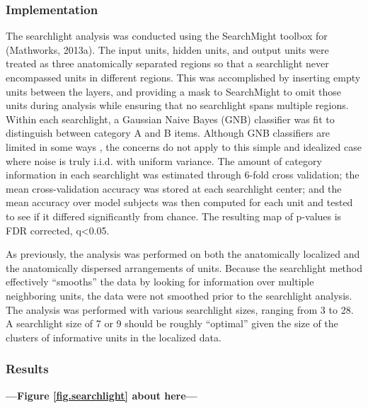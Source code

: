 \subsubsection{Implementation}
The searchlight analysis was conducted using the SearchMight toolbox \cite{pereira_information_2011} for \matlab (Mathworks, 2013a). The input units, hidden units, and output units were treated as three anatomically separated regions so that a searchlight never encompassed units in different regions. This was accomplished by inserting empty units between the layers, and providing a mask to SearchMight to omit those units during analysis while ensuring that no searchlight spans multiple regions. Within each searchlight, a Gaussian Naive Bayes (GNB) classifier was fit to distinguish between category A and B items. Although GNB classifiers are limited in some ways \cite{pereira_information_2011}, the concerns do not apply to this simple and idealized case where noise is truly i.i.d. with uniform variance. The amount of category information in each searchlight was estimated through 6-fold cross validation; the mean cross-validation accuracy was stored at each searchlight center; and the mean accuracy over model subjects was then computed for each unit and tested to see if it differed significantly from chance. The resulting map of p-values is FDR corrected, q<0.05.

As previously, the analysis was performed on both the anatomically localized and the anatomically dispersed arrangements of units. Because the searchlight method effectively ``smooths'' the data by looking for information over multiple neighboring units, the data were not smoothed prior to the searchlight analysis. The analysis was performed with various searchlight sizes, ranging from 3 to 28. A searchlight size of 7 or 9 should be roughly ``optimal'' given the size of the clusters of informative units in the localized data.

\subsubsection{Results} 

\begin{center}
\textbf{---Figure \ref{fig.searchlight} about here---}
\end{center}


